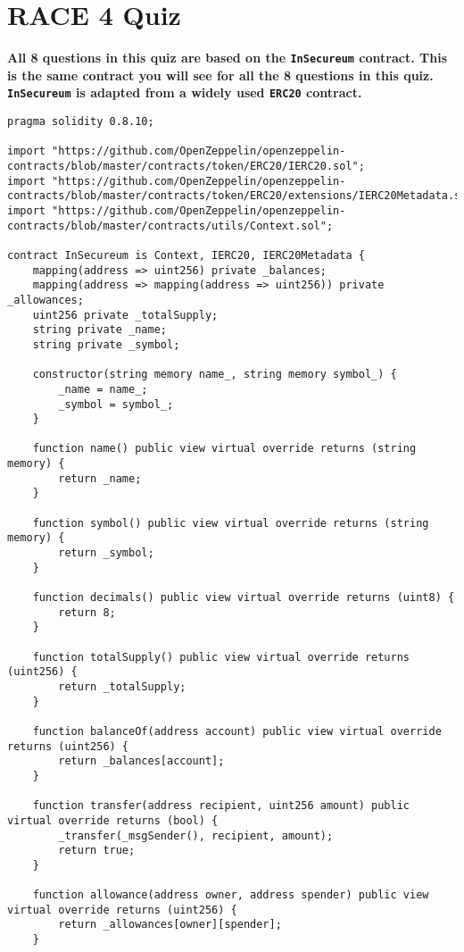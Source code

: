 \section{RACE 4 Quiz}

\textbf{All 8 questions in this quiz are based on the \texttt{InSecureum} contract.
This is the same contract you will see for all the 8 questions in this quiz.
\texttt{InSecureum} is adapted from a widely used \texttt{ERC20} contract.}

\begin{lstlisting}[language=Solidity, style=solStyle]
pragma solidity 0.8.10;

import "https://github.com/OpenZeppelin/openzeppelin-contracts/blob/master/contracts/token/ERC20/IERC20.sol";
import "https://github.com/OpenZeppelin/openzeppelin-contracts/blob/master/contracts/token/ERC20/extensions/IERC20Metadata.sol";
import "https://github.com/OpenZeppelin/openzeppelin-contracts/blob/master/contracts/utils/Context.sol";

contract InSecureum is Context, IERC20, IERC20Metadata {
    mapping(address => uint256) private _balances;
    mapping(address => mapping(address => uint256)) private _allowances;
    uint256 private _totalSupply;
    string private _name;
    string private _symbol;

    constructor(string memory name_, string memory symbol_) {
        _name = name_;
        _symbol = symbol_;
    }

    function name() public view virtual override returns (string memory) {
        return _name;
    }

    function symbol() public view virtual override returns (string memory) {
        return _symbol;
    }

    function decimals() public view virtual override returns (uint8) {
        return 8;
    }

    function totalSupply() public view virtual override returns (uint256) {
        return _totalSupply;
    }

    function balanceOf(address account) public view virtual override returns (uint256) {
        return _balances[account];
    }

    function transfer(address recipient, uint256 amount) public virtual override returns (bool) {
        _transfer(_msgSender(), recipient, amount);
        return true;
    }

    function allowance(address owner, address spender) public view virtual override returns (uint256) {
        return _allowances[owner][spender];
    }


\end{lstlisting}
